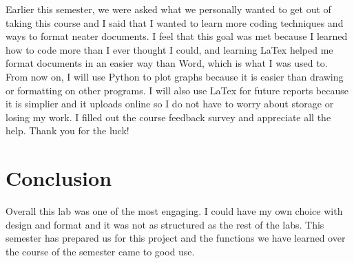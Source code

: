 \documentclass[12pt]{report}
\begin{document}
Earlier this semester, we were asked what we personally wanted to get out of taking this course and I said that I wanted to learn more coding techniques and ways to format neater documents. I feel that this goal was met because I learned how to code more than I ever thought I could, and learning LaTex helped me format documents in an easier way than Word, which is what I was used to. From now on, I will use Python to plot graphs because it is easier than drawing or formatting on other programs. I will also use LaTex for future reports because it is simplier and it uploads online so I do not have to worry about storage or losing my work. I filled out the course feedback survey and appreciate all the help. Thank you for the luck! 

\section{Conclusion}
Overall this lab was one of the most engaging. I could have my own choice with design and format and it was not as structured as the rest of the labs. This semester has prepared us for this project and the functions we have learned over the course of the semester came to good use. 
\end{document}
